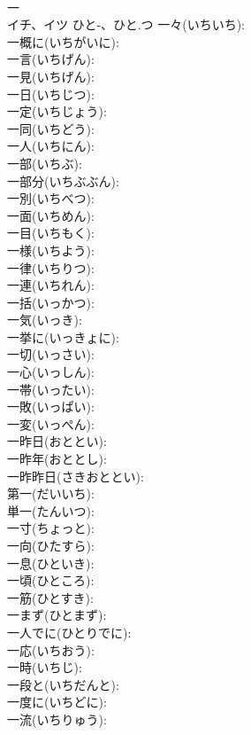 \documentclass[8pt]{extreport}
\begin{document}
\begin{CJK}{UTF8}{min}
\\	一			
\\	イチ、イツ	ひと-、ひと.つ	一々(いちいち): 
\\	一概に(いちがいに): 
\\	一言(いちげん): 
\\	一見(いちげん): 
\\	一日(いちじつ): 
\\	一定(いちじょう): 
\\	一同(いちどう): 
\\	一人(いちにん): 
\\	一部(いちぶ): 
\\	一部分(いちぶぶん): 
\\	一別(いちべつ): 
\\	一面(いちめん): 
\\	一目(いちもく): 
\\	一様(いちよう): 
\\	一律(いちりつ): 
\\	一連(いちれん): 
\\	一括(いっかつ): 
\\	一気(いっき): 
\\	一挙に(いっきょに): 
\\	一切(いっさい): 
\\	一心(いっしん): 
\\	一帯(いったい): 
\\	一敗(いっぱい): 
\\	一変(いっぺん): 
\\	一昨日(おととい): 
\\	一昨年(おととし): 
\\	一昨昨日(さきおととい): 
\\	第一(だいいち): 
\\	単一(たんいつ): 
\\	一寸(ちょっと): 
\\	一向(ひたすら): 
\\	一息(ひといき): 
\\	一頃(ひところ): 
\\	一筋(ひとすき): 
\\	一まず(ひとまず): 
\\	一人でに(ひとりでに): 
\\	一応(いちおう): 
\\	一時(いちじ): 
\\	一段と(いちだんと): 
\\	一度に(いちどに): 
\\	一流(いちりゅう): 

\end{CJK}
\end{document}
